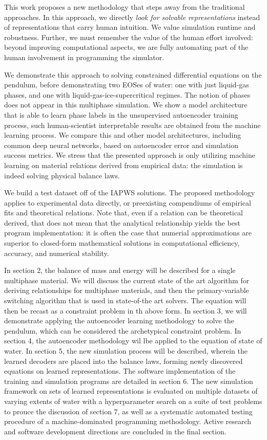 \documentclass[]{article}
\begin{document}
This work proposes a new methodology that steps away from the
traditional approaches. 
In this approach, we directly \emph{look for solvable representations}
instead of representations that carry human intuition. We value
simulation runtime and robustness. Further, we must remember the value
of the human effort involved: beyond improving computational aspects,
we are fully automating part of the human involvement in programming
the simulator.




We demonstrate this approach to solving constrained differential
equations on the pendulum, before demonstrating two EOSes of water: one
with just liquid-gas phases, and one with liquid-gas-ice-supercritical
regimes. The notion of phases does not appear in this multiphase
simulation. We show a model architecture that is able to learn phase
labels in the unsupervised autoencoder training process, such
human-scientist interpretable results are obtained from the machine
learning process. We compare this and other model architectures,
including common deep neural networks, based on autoencoder error and
simulation success metrics. We stress that the presented approach is
only utilizing machine learning on material relations derived from
empirical data: the simulation is indeed solving physical balance laws.

We build a test dataset off of the IAPWS solutions. The proposed
methodology applies to experimental data directly, or preexisting
compendiums of empirical fits and theoretical relations.
Note that, even if a relation can be theoretical derived, that does
not mean that the analytical relationship yields the best program
implementation: it is often the case that numerial approximations are
superior to closed-form mathematical solutions in computational
efficiency, accuracy, and numerical stability.

In section 2, the balance of mass and energy will be described for a
single multiphase material. We will discuss the current state of the
art algorithm for deriving relationships for multiphase materials, and
then the primary-variable switching algorithm that is used in
state-of-the art solvers. The equation will then be recast as a
constraint problem in th above form.
In section 3, we will demonstrate applying the autoencoder learning
methodology to solve the pendulum,
which can be considered the archetypical constraint problem.
In section 4, the autoencoder methodology wil lbe applied to the
equation of state of water. In section 5, the new simulation process
will be described, wherein the learned decoders are placed into the
balance laws, forming newly discovered equations on learned
representations. The software implementation of the training and
simulation programs are detailed in section 6. The new simulation
framework on sets of learned representations is evaluated on
multiple datasets of varying extents of water with a
hyperparameter search on a suite of test problems to prouce the discussion of section 7, as
well as a systematic automated testing procedure of a
machine-dominated programming methodology.
Active research and software development directions are
concluded in the final section.
\end{document}
